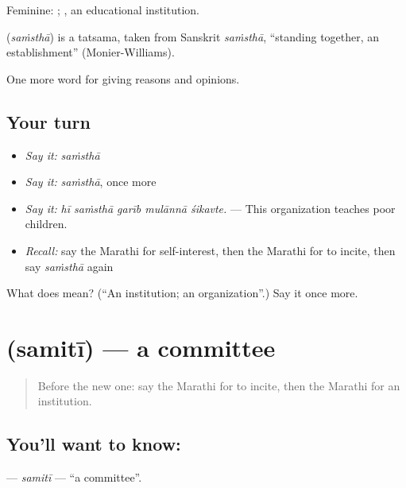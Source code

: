 Feminine:  ; , an educational institution.

\begin{cousinweb}
\textbf{} (\emph{saṁsthā}) is a tatsama, taken from Sanskrit \emph{saṁsthā}, \textquotedblleft{}standing together, an establishment\textquotedblright{} (Monier-Williams).
\end{cousinweb}

\begin{grammarlens}[title={What you've built}]
One more word for giving reasons and opinions.
\end{grammarlens}

\subsection*{Your turn}
\begin{itemize}
\raggedright
  \item \emph{Say it:} \emph{saṁsthā}
  \item \emph{Say it:} \emph{saṁsthā}, once more
  \item \emph{Say it:} \emph{hī saṁsthā garīb mulānnā śikavte.} — This organization teaches poor children.
  \item \emph{Recall:} say the Marathi for self-interest, then the Marathi for to incite, then say \emph{saṁsthā} again
\end{itemize}

\begin{tcolorbox}[breakable,colback=teal!4,colframe=teal!35!black,title={Before you move on}]
What does  mean? (\textquotedblleft{}An institution; an organization\textquotedblright{}.) Say it once more.
\end{tcolorbox}
\section[\texorpdfstring{\mr{समिती} (samitī)}{समिती (samitī)}]{ (samitī) — a committee}

\label{lesson:MR-C364-samiti}



\begin{quote}
Before the new one: say the Marathi for to incite, then the Marathi for an institution.
\end{quote}

\subsection*{You'll want to know: }
\textbf{} — \emph{samitī} — \textquotedblleft{}a committee\textquotedblright{}.

